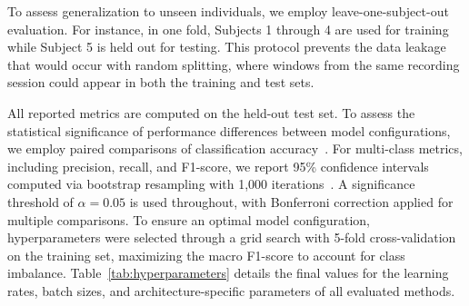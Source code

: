 \documentclass[pdflatex,sn-nature,iicol]{sn-jnl}
\begin{document}
To assess generalization to unseen individuals, we employ leave-one-subject-out evaluation. For instance, in one fold, Subjects 1 through 4 are used for training while Subject 5 is held out for testing. This protocol prevents the data leakage that would occur with random splitting, where windows from the same recording session could appear in both the training and test sets.

All reported metrics are computed on the held-out test set. To assess the statistical significance of performance differences between model configurations, we employ paired comparisons of classification accuracy~\cite{demsar2006statistical}. For multi-class metrics, including precision, recall, and F1-score, we report 95\% confidence intervals computed via bootstrap resampling with 1,000 iterations~\cite{lehmann2006testing}. A significance threshold of $\alpha = 0.05$ is used throughout, with Bonferroni correction applied for multiple comparisons. To ensure an optimal model configuration, hyperparameters were selected through a grid search with 5-fold cross-validation on the training set, maximizing the macro F1-score to account for class imbalance. Table~\ref{tab:hyperparameters} details the final values for the learning rates, batch sizes, and architecture-specific parameters of all evaluated methods.
\end{document}
